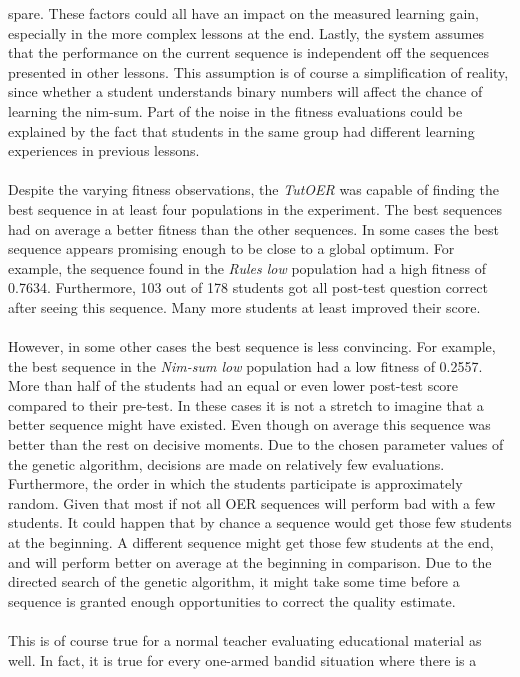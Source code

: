 spare. These factors could all have an impact on the measured learning gain,
especially in the more complex lessons at the end. Lastly, the system assumes
that the performance on the current sequence is independent off the sequences
presented in other lessons. This assumption is of course a simplification of
reality, since whether a student understands binary numbers will affect the
chance of learning the nim-sum. Part of the noise in the fitness evaluations
could be explained by the fact that students in the same group had different
learning experiences in previous lessons.\\\\
\noindent
Despite the varying fitness observations, the \emph{TutOER} was capable of
finding the best sequence in at least four populations in the experiment. The
best sequences had on average a better fitness than the other sequences. In some
cases the best sequence appears promising enough to be close to a global
optimum. For example, the sequence found in the \emph{Rules low} population had
a high fitness of 0.7634. Furthermore, 103 out of 178 students got all
post-test question correct after seeing this sequence. Many more students at
least improved their score.\\\\
\noindent
However, in some other cases the best sequence is less convincing. For example,
the best sequence in the \emph{Nim-sum low} population had a low fitness of
0.2557. More than half of the students had an equal or even lower post-test
score compared to their pre-test. In these cases it is not a stretch to imagine
that a better sequence might have existed. Even though on average this sequence
was better than the rest on decisive moments. Due to the chosen parameter
values of the genetic algorithm, decisions are made on relatively few
evaluations. Furthermore, the order in which the students participate is
approximately random. Given that most if not all OER sequences will perform bad
with a few students. It could happen that by chance a sequence would get those
few students at the beginning. A different sequence might get those few
students at the end, and will perform better on average at the beginning in
comparison. Due to the directed search of the genetic algorithm, it might take
some time before a sequence is granted enough opportunities to correct the
quality estimate.\\\\
\noindent
This is of course true for a normal teacher evaluating educational material as
well. In fact, it is true for every one-armed bandid situation where there is a
